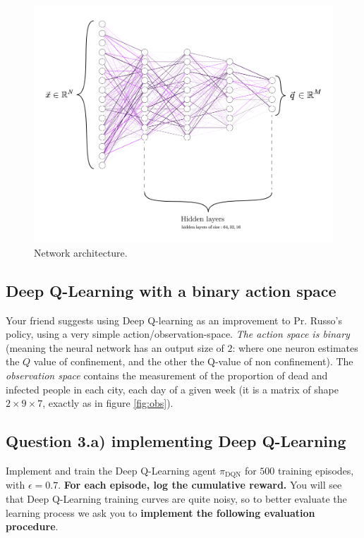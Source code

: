 \documentclass[10pt]{article}
\begin{document}


\begin{figure}[h!]
  \centering
  \includegraphics[width=.7\textwidth]{figures/arch.png}
  \caption{Network architecture.}
  \label{fig:arch}
\end{figure}

\subsection{Deep Q-Learning with a binary action space}

Your friend suggests using Deep Q-learning as an improvement to Pr. Russo's policy, using a very simple action/observation-space. \textit{The action space is binary} (meaning the neural network has an output size of $2$: where one neuron estimates the $Q$ value of confinement, and the other the Q-value of non confinement). The \textit{observation space} contains the measurement of the proportion of dead and infected people in each city, each day of a given week (it is a matrix of shape $2 \times 9 \times 7$, exactly as in figure \ref{fig:obs}).

\subsection*{Question 3.a) implementing Deep Q-Learning}
Implement and train the Deep Q-Learning agent $\pi_\text{DQN}$ for $500$ training episodes, with $\epsilon=0.7$. \textbf{For each episode, log the cumulative reward.}
You will see that Deep Q-Learning training curves are quite noisy, so to better evaluate the learning process we ask you to \textbf{implement the following evaluation procedure}.
\end{document}
